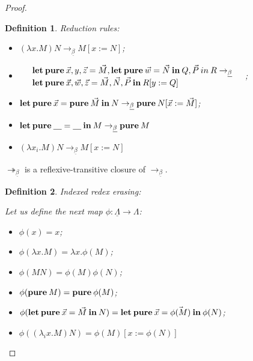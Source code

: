 \documentclass[a4paper]{article}
\newtheorem{defin}{Definition}
\begin{document}
\begin{proof}
\begin{defin} Reduction rules:

\begin{itemize}
  \item $(\lambda x. M) N \rightarrow_{\underline{\beta}} M [x := N]$;
  \item $\begin{array}{llll}
  & {\bf let \: pure \:} \vec{x}, y, \vec{z} = \vec{M}, {\bf let \: pure \: } \vec{w} = \vec{N} {\bf \: in \: } Q, \vec{P} {\: in \:} R \rightarrow_{\underline{\beta}} & \\
  & {\bf let \: pure \:} \vec{x}, \vec{w}, \vec{z} = \vec{M}, \vec{N}, \vec{P} \: { \bf in } \: R [y := Q]
  \end{array}$;
  \item ${\bf let \: pure \:} \vec{x} = {\bf pure \:} \vec{M} {\: \bf in \:} N \rightarrow_{\underline{\beta}} {\bf pure \:} N [\vec{x} := \vec{M}]$;
  \item ${\bf let \: pure \:} \underline{\quad} = \underline {\quad} {\: \bf in \:} M \rightarrow_{\underline{\beta}} {\bf pure \:} M$
  \item $(\lambda x_i. M) N \rightarrow_{\underline{\beta}} M [x := N]$
\end{itemize}
\end{defin}

$\twoheadrightarrow_{\underline{\beta}}$ is a reflexive-transitive closure of $\rightarrow_{\underline{\beta}}$.

\begin{defin} Indexed redex erasing:

  Let us define the next map $\phi : \underline{\Lambda} \to \Lambda$:

  \begin{itemize}
    \item $\phi(x) = x$;
    \item $\phi(\lambda x. M) = \lambda x. \phi(M)$;
    \item $\phi(M N) = \phi(M) \phi(N)$;
    \item $\phi({\bf pure \:} M) = {\bf pure \:} \phi(M)$;
    \item $\phi({\bf let \: pure \:} \vec{x} = \vec{M} {\: \bf in \:} N) = {\bf let \: pure \:} \vec{x} = \vec{\phi(M)} {\: \bf in \:} \phi(N)$;
    \item $\phi((\lambda_i x. M) N) = \phi(M) [x := \phi(N)]$
  \end{itemize}
\end{defin}


\end{proof}
\end{document}
